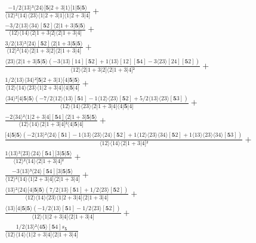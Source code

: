 \documentclass[varwidth, border=5pt]{standalone}
\begin{document}
\begin{my}
$\begin{gathered}
\scriptscriptstyle\frac{-1/2⟨13⟩³⟨24⟩[𝟓|2+3|1⟩[1|𝟓|𝟓⟩}{⟨12⟩²⟨14⟩⟨23⟩⟨1|2+3|1]⟨1|2+3|4]} +\\
\scriptscriptstyle\frac{-3/2⟨13⟩⟨34⟩[𝟓2]⟨2|1+3|𝟓|𝟓⟩}{⟨12⟩⟨14⟩⟨2|1+3|2]⟨2|1+3|4]} +\\
\scriptscriptstyle\frac{3/2⟨13⟩²⟨24⟩[𝟓2]⟨2|1+3|𝟓|𝟓⟩}{⟨12⟩²⟨14⟩⟨2|1+3|2]⟨2|1+3|4]} +\\
\scriptscriptstyle\frac{⟨23⟩⟨2|1+3|𝟓|𝟓⟩(-3⟨13⟩[14][𝟓2]+1⟨13⟩[12][𝟓4]-3⟨23⟩[24][𝟓2])}{⟨12⟩⟨2|1+3|2]⟨2|1+3|4]²} +\\
\scriptscriptstyle\frac{1/2⟨13⟩⟨34⟩²[𝟓|2+3|1⟩[4|𝟓|𝟓⟩}{⟨12⟩⟨14⟩⟨23⟩⟨1|2+3|4]⟨4|𝟓|4]} +\\
\scriptscriptstyle\frac{⟨34⟩²[4|𝟓|𝟓⟩(-7/2⟨12⟩⟨13⟩[𝟓1]-1⟨12⟩⟨23⟩[𝟓2]+5/2⟨13⟩⟨23⟩[𝟓3])}{⟨12⟩⟨14⟩⟨23⟩⟨2|1+3|4]⟨4|𝟓|4]} +\\
\scriptscriptstyle\frac{-2⟨34⟩²⟨1|2+3|4][𝟓4]⟨2|1+3|𝟓|𝟓⟩}{⟨12⟩⟨14⟩⟨2|1+3|4]²⟨4|𝟓|4]} +\\
\scriptscriptstyle\frac{[4|𝟓|𝟓⟩(-2⟨13⟩²⟨24⟩[𝟓1]-1⟨13⟩⟨23⟩⟨24⟩[𝟓2]+1⟨12⟩⟨23⟩⟨34⟩[𝟓2]+1⟨13⟩⟨23⟩⟨34⟩[𝟓3])}{⟨12⟩⟨14⟩⟨2|1+3|4]²} +\\
\scriptscriptstyle\frac{1⟨13⟩²⟨23⟩⟨24⟩[𝟓4][3|𝟓|𝟓⟩}{⟨12⟩²⟨14⟩⟨2|1+3|4]²} +\\
\scriptscriptstyle\frac{-3⟨13⟩³⟨24⟩[𝟓4][3|𝟓|𝟓⟩}{⟨12⟩²⟨14⟩⟨1|2+3|4]⟨2|1+3|4]} +\\
\scriptscriptstyle\frac{⟨13⟩²⟨24⟩[4|𝟓|𝟓⟩(7/2⟨13⟩[𝟓1]+1/2⟨23⟩[𝟓2])}{⟨12⟩⟨14⟩⟨23⟩⟨1|2+3|4]⟨2|1+3|4]} +\\
\scriptscriptstyle\frac{⟨13⟩[4|𝟓|𝟓⟩(-1/2⟨13⟩[𝟓1]-1/2⟨23⟩[𝟓2])}{⟨12⟩⟨1|2+3|4]⟨2|1+3|4]} +\\
\scriptscriptstyle\frac{1/2⟨13⟩²⟨4𝟓⟩[𝟓4]s_{𝟓}}{⟨12⟩⟨14⟩⟨1|2+3|4]⟨2|1+3|4]} \phantom{+}
\end{gathered}$
\end{my}
\end{document}

